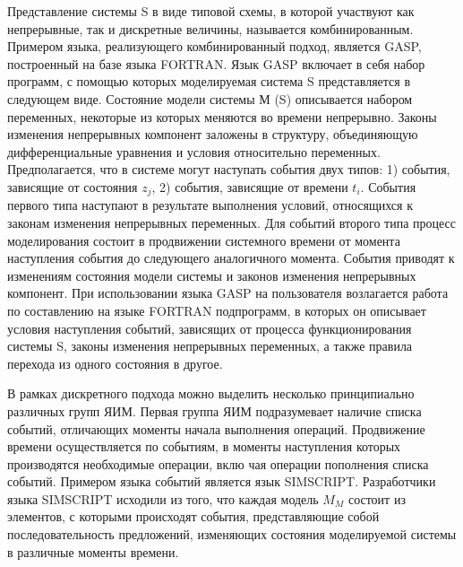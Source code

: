     Представление системы S в виде типовой схемы, в которой участвуют как непрерывные, так и дискретные величины, называется комбинированным. Примером языка, реализующего комбинированный подход, является GASP, построенный на базе языка FORTRAN. Язык GASP включает в себя набор программ, с помощью которых моделируемая система S представляется в следующем виде. Состояние модели системы М (S) описывается набором переменных, некоторые из которых меняются во времени непрерывно. Законы изменения непрерывных компонент заложены в структуру, объединяющую дифференциальные уравнения и условия относительно переменных. Предполагается, что в системе могут наступать события двух типов: 1) события, зависящие от состояния $z_{j}$, 2) события, зависящие от времени $t_{i}$. События первого типа наступают в результате выполнения условий, относящихся к законам изменения непрерывных переменных. Для событий второго типа процесс моделирования состоит в продвижении системного времени от момента наступления события до следующего аналогичного момента. События приводят к изменениям состояния модели системы и законов изменения непрерывных компонент. При использовании языка GASP на пользователя возлагается работа по составлению на языке FORTRAN подпрограмм, в которых он описывает условия наступления событий, зависящих от процесса функционирования системы S, законы изменения непрерывных переменных, а также правила перехода из одного состояния в другое.

    В рамках дискретного подхода можно выделить несколько принципиально различных групп ЯИМ. Первая группа ЯИМ подразумевает наличие списка событий, отличающих моменты начала выполнения операций. Продвижение времени осуществляется по событиям, в моменты наступления которых производятся необходимые операции, вклю­
чая операции пополнения списка событий. Примером языка событий является язык SIMSCRIPT. Разработчики языка SIMSCRIPT исходили из того, что каждая модель $M_{M}$ состоит из элементов, с которыми происходят события, представляющие собой последовательность предложений, изменяющих состояния моделируемой системы в различные моменты времени.


